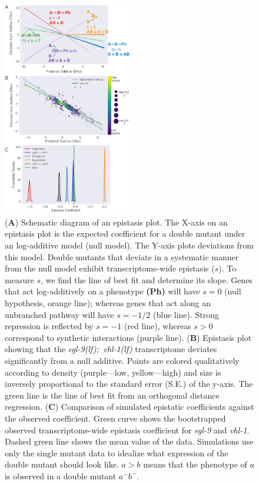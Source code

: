 \documentclass[9pt,twocolumn,twoside]{pnas-new}
\newcommand{\gene}[1]{\mbox{\emph{#1}}}
\newcommand{\eglvhl}{\gene{egl-9(lf); vhl-1(lf)}}
\begin{document}
\begin{figure}[tbhp]
  \centering
  \includegraphics[width=0.5\textwidth]{../final_figs/egl9vhl1-epistasis.pdf}
  \caption{
    (\textbf{A}) Schematic diagram of an epistasis plot. The X-axis on an
    epistasis plot is the expected coefficient for a double mutant under an
    log-additive model (null model). The Y-axis plots deviations from this
    model. Double mutants that deviate in a systematic manner from the null
    model exhibit transcriptome-wide epistasis ($s$). To measure $s$, we find
    the line of best fit and determine its slope. Genes that act log-additively
    on a phenotype \textbf{(Ph)} will have $s=0$ (null hypothesis, orange line);
    whereas genes that act along an unbranched pathway will have $s=-1/2$ (blue
    line). Strong repression is reflected by $s=-1$ (red line), whereas $s>0$
    correspond to synthetic interactions (purple line). (\textbf{B}) Epistasis
    plot showing that the \eglvhl{} transcriptome deviates significantly from a
    null additive. Points are colored qualitatively according to density
    (purple---low, yellow---high) and size is inversely proportional to the
    standard error (S.E.) of the y-axis. The green line is the line of best fit
    from an orthogonal distance regression. (\textbf{C}) Comparison of simulated
    epistatic coefficients against the observed coefficient. Green curve shows
    the bootstrapped observed transcriptome-wide epistasis coefficient for
    \gene{egl-9} and \gene{vhl-1}. Dashed green line shows the mean value of the
    data. Simulations use only the single mutant data to idealize what
    expression of the double mutant should look like. $a > b$ means that the
    phenotype of $a$ is observed in a double mutant $a^-b^-$. }
\label{fig:egl9epistasis}
\end{figure}
\end{document}
